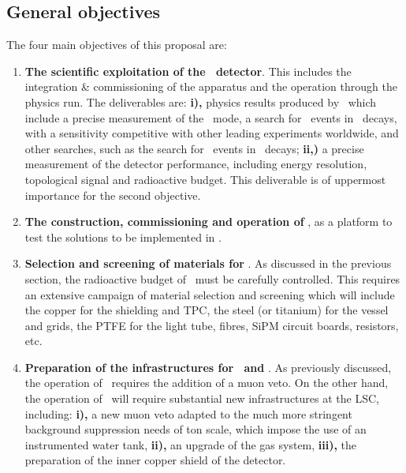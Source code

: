 
\subsection*{General objectives}

The four main objectives of this proposal are:
\begin{enumerate}
\item {\bf The scientific exploitation of the \Next\ detector}. This includes the integration \& commissioning of the apparatus and the operation through the physics run. The deliverables are: {\bf i),} physics results produced by \Next\ which include a precise measurement of the \bbtnu\ mode, a search for \bbonu\ events in \XE\ decays, with a sensitivity competitive with other leading experiments worldwide, and other searches, such as the search for \bbonu\ events in \XEX\ decays; {\bf ii,)} a precise measurement of the detector performance, including energy resolution, topological signal and radioactive budget. This deliverable is of uppermost importance for the second objective. 
\item {\bf The construction, commissioning and operation of \HDEMO}, as a platform to test the solutions to be implemented in \NHD.  
\item {\bf Selection and screening of materials for \NHD}. As discussed in the previous section, the radioactive budget of \NHD\ must be carefully controlled. This requires an extensive campaign of material selection and screening which will include the copper for the shielding and TPC, the steel (or titanium) for the vessel and grids, the PTFE for the light tube, fibres, SiPM circuit boards, resistors, etc. 
\item {\bf Preparation of the infrastructures for \Next\ and \NHD}. As previously discussed, the operation of \Next\ requires the addition of a muon veto. On the other hand, the operation of \NHD\ will require substantial new infrastructures at the LSC, including: {\bf i),} a new muon veto adapted to the much more stringent background suppression needs of ton scale, which impose the use of an instrumented water tank, {\bf ii),} an upgrade of the gas system, {\bf iii),} the preparation of the inner copper shield of the detector. 


\end{enumerate}
